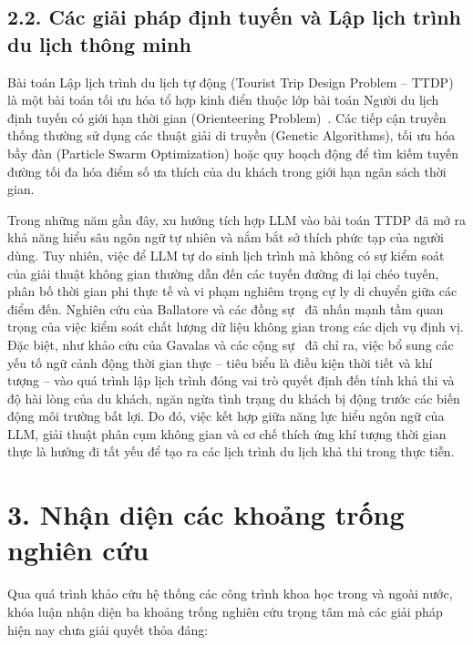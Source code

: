 \subsection*{2.2. Các giải pháp định tuyến và Lập lịch trình du lịch thông minh}
{}

Bài toán Lập lịch trình du lịch tự động (Tourist Trip Design Problem -- TTDP) là một bài toán tối ưu hóa tổ hợp kinh điển thuộc lớp bài toán Người du lịch định tuyến có giới hạn thời gian (Orienteering Problem)~\cite{vansteenwegen2011orienteering}. Các tiếp cận truyền thống thường sử dụng các thuật giải di truyền (Genetic Algorithms), tối ưu hóa bầy đàn (Particle Swarm Optimization) hoặc quy hoạch động để tìm kiếm tuyến đường tối đa hóa điểm số ưa thích của du khách trong giới hạn ngân sách thời gian.

Trong những năm gần đây, xu hướng tích hợp LLM vào bài toán TTDP đã mở ra khả năng hiểu sâu ngôn ngữ tự nhiên và nắm bắt sở thích phức tạp của người dùng. Tuy nhiên, việc để LLM tự do sinh lịch trình mà không có sự kiểm soát của giải thuật không gian thường dẫn đến các tuyến đường đi lại chéo tuyến, phân bố thời gian phi thực tế và vi phạm nghiêm trọng cự ly di chuyển giữa các điểm đến. Nghiên cứu của Ballatore và các đồng sự~\cite{ballatore2014spatial} đã nhấn mạnh tầm quan trọng của việc kiểm soát chất lượng dữ liệu không gian trong các dịch vụ định vị. Đặc biệt, như khảo cứu của Gavalas và các cộng sự~\cite{gavalas2014context} đã chỉ ra, việc bổ sung các yếu tố ngữ cảnh động thời gian thực -- tiêu biểu là điều kiện thời tiết và khí tượng -- vào quá trình lập lịch trình đóng vai trò quyết định đến tính khả thi và độ hài lòng của du khách, ngăn ngừa tình trạng du khách bị động trước các biến động môi trường bất lợi. Do đó, việc kết hợp giữa năng lực hiểu ngôn ngữ của LLM, giải thuật phân cụm không gian và cơ chế thích ứng khí tượng thời gian thực là hướng đi tất yếu để tạo ra các lịch trình du lịch khả thi trong thực tiễn.

\section*{3. Nhận diện các khoảng trống nghiên cứu}
{}

Qua quá trình khảo cứu hệ thống các công trình khoa học trong và ngoài nước, khóa luận nhận diện ba khoảng trống nghiên cứu trọng tâm mà các giải pháp hiện nay chưa giải quyết thỏa đáng:

